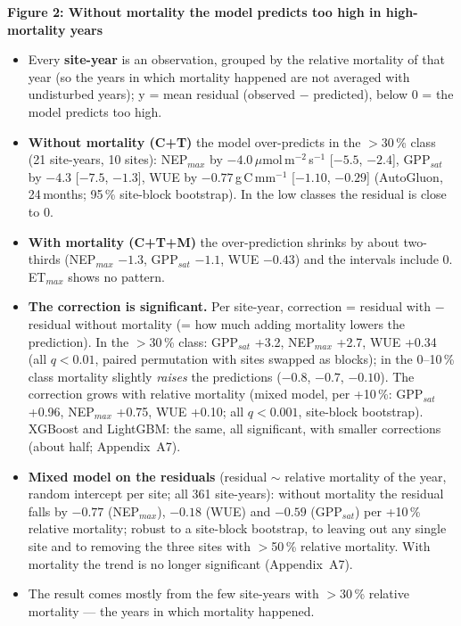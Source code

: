 

\textbf{Figure 2: Without mortality the model predicts too high in high-mortality years}
\begin{itemize}
  \item Every \textbf{site-year} is an observation, grouped by the relative mortality of that year (so the years in which
        mortality happened are not averaged with undisturbed years); y = mean residual (observed $-$ predicted), below 0 = the
        model predicts too high.
  \item \textbf{Without mortality (C+T)} the model over-predicts in the $>$30\,\% class (21 site-years, 10 sites):
        NEP$_{max}$ by $-4.0$\,$\mu$mol\,m$^{-2}$\,s$^{-1}$ [$-5.5$, $-2.4$], GPP$_{sat}$ by $-4.3$ [$-7.5$, $-1.3$],
        WUE by $-0.77$\,g\,C\,mm$^{-1}$ [$-1.10$, $-0.29$] (AutoGluon, 24\,months; 95\,\% site-block bootstrap).
        In the low classes the residual is close to 0.
  \item \textbf{With mortality (C+T+M)} the over-prediction shrinks by about two-thirds (NEP$_{max}$ $-1.3$, GPP$_{sat}$
        $-1.1$, WUE $-0.43$) and the intervals include 0. ET$_{max}$ shows no pattern.
  \item \textbf{The correction is significant.} Per site-year, correction = residual with $-$ residual without mortality
        (= how much adding mortality lowers the prediction). In the $>$30\,\% class: GPP$_{sat}$ +3.2, NEP$_{max}$ +2.7,
        WUE +0.34 (all $q<0.01$, paired permutation with sites swapped as blocks); in the 0--10\,\% class mortality
        slightly \emph{raises} the predictions ($-0.8$, $-0.7$, $-0.10$). The correction grows with relative mortality
        (mixed model, per +10\,\%: GPP$_{sat}$ +0.96, NEP$_{max}$ +0.75, WUE +0.10; all $q<0.001$, site-block bootstrap).
        XGBoost and LightGBM: the same, all significant, with smaller corrections (about half; Appendix~A7).
  \item \textbf{Mixed model on the residuals} (residual $\sim$ relative mortality of the year, random intercept per site; all
        361 site-years): without mortality the residual falls by $-0.77$ (NEP$_{max}$), $-0.18$ (WUE) and $-0.59$
        (GPP$_{sat}$) per +10\,\% relative mortality; robust to a site-block bootstrap, to leaving out any single site and to
        removing the three sites with $>$50\,\% relative mortality. With mortality the trend is no longer significant (Appendix~A7).
  \item The result comes mostly from the few site-years with $>$30\,\% relative mortality --- the years in which mortality happened.
\end{itemize}

